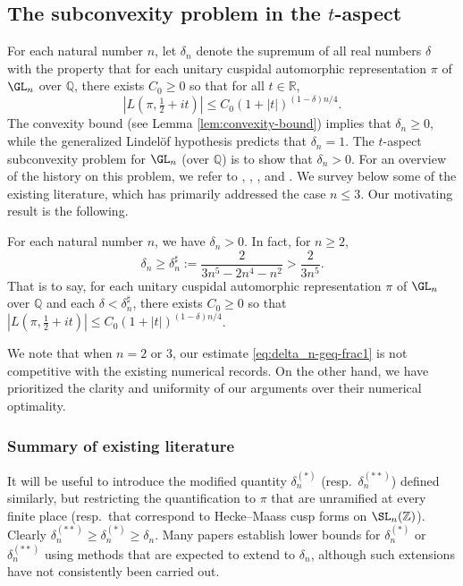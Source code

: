 \subsection{The subconvexity problem in the $t$-aspect}\label{sec:subc-probl-t}
For each natural number $n$, let $\delta_n$ denote the supremum of all real numbers $\delta$ with the property that for each unitary cuspidal automorphic representation $\pi$ of $\GL_n$ over $\mathbb{Q}$, there exists $C_0 \geq 0$ so that for all $t \in \mathbb{R}$,
\begin{equation}\label{eq:lpi-tfrac12-+}
  |L(\pi,\tfrac{1}{2} + i  t)| \leq C_0 (1 + |t|)^{(1 - \delta) n/4}.
\end{equation}
The convexity bound (see Lemma \ref{lem:convexity-bound}) implies that $\delta_n \geq 0$, while the generalized Lindel\"{o}f hypothesis predicts that $\delta_n = 1$.  The $t$-aspect subconvexity problem for $\GL_n$ (over $\mathbb{Q}$) is to show that $\delta_n > 0$.  For an overview of the history on this problem, we refer to \cite{MR1403937}, \cite[\S2]{MR1826269}, \cite{MichelVenkateshICM}, \cite[\S4, \S5]{MR2331346} and \cite{MR3966770}.  We survey below some of the existing literature, which has primarily addressed the case $n \leq 3$.  Our motivating result is the following.
\begin{theorem}\label{thm:t-aspect}
  For each natural number $n$, we have $\delta_n > 0$.  In fact, for $n \geq 2$,
  \begin{equation}\label{eq:delta_n-geq-frac1}
    \delta_n \geq \delta_n^\sharp := \frac{2}{ 3 n^5 - 2 n^4 - n^2 } > \frac{2}{3 n^5}.
  \end{equation}
  That is to say, for each unitary cuspidal automorphic representation $\pi$ of $\GL_n$ over $\mathbb{Q}$ and each $\delta < \delta_n^\sharp$, there exists $C_0 \geq 0$ so that $|L(\pi,\tfrac{1}{2} + i t)| \leq C_0 (1 + |t|)^{(1 - \delta) n/4}$.
\end{theorem}

We note that when $n=2$ or $3$, our estimate \eqref{eq:delta_n-geq-frac1} is not competitive with the existing numerical records.  On the other hand, we have prioritized the clarity and uniformity of our arguments over their numerical optimality.


\subsubsection*{Summary of existing literature}
It will be useful to introduce the modified quantity $\delta_n^{(*)}$ (resp.\ $\delta_{n}^{(**)}$) defined similarly, but restricting the quantification to $\pi$ that are unramified at every finite place (resp.\ that correspond to Hecke--Maass cusp forms on $\SL_n(\mathbb{Z})$).  Clearly $\delta_n^{(**)} \geq \delta_n^{(*)} \geq \delta_n$.  Many papers establish lower bounds for $\delta_n^{(*)}$ or $\delta_n^{(**)}$ using methods that are expected to extend to $\delta_n$, although such extensions have not consistently been carried out.


